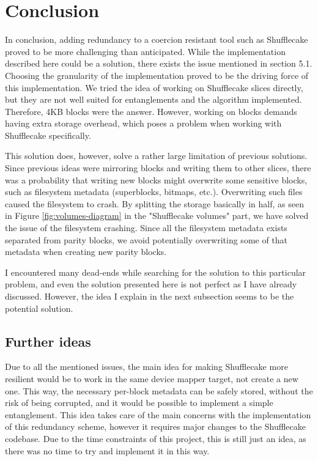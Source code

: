 \documentclass[a4paper,11pt,oneside]{report}
\begin{document}
\chapter{Conclusion}
In conclusion, adding redundancy to a coercion resistant tool such as Shufflecake proved to be more challenging than anticipated. While the implementation described here could be a solution, there exists the issue mentioned in section 5.1. Choosing the granularity of the implementation proved to be the driving force of this implementation. We tried the idea of working on Shufflecake slices directly, but they are not well suited for entanglements and the algorithm implemented. Therefore, 4KB blocks were the answer. However, working on blocks demands having extra storage overhead, which poses a problem when working with Shufflecake specifically. 

This solution does, however, solve a rather large limitation of previous solutions. Since previous ideas were mirroring blocks and writing them to other slices, there was a probability that writing new blocks might overwrite some sensitive blocks, such as filesystem metadata (superblocks, bitmaps, etc.). Overwriting such files caused the filesystem to crash. By splitting the storage basically in half, as seen in Figure \ref{fig:volumes-diagram} in the "Shufflecake volumes" part, we have solved the issue of the filesystem crashing. Since all the filesystem metadata exists separated from parity blocks, we avoid potentially overwriting some of that metadata when creating new parity blocks. 

I encountered many dead-ends while searching for the solution to this particular problem, and even the solution presented here is not perfect as I have already discussed. However, the idea I explain in the next subsection seems to be the potential solution. 

\section{Further ideas}
Due to all the mentioned issues, the main idea for making Shufflecake more resilient would be to work in the same device mapper target, not create a new one. This way, the necessary per-block metadata can be safely stored, without the risk of being corrupted, and it would be possible to implement a simple entanglement. This idea takes care of the main concerns with the implementation of this redundancy scheme, however it requires major changes to the Shufflecake codebase. Due to the time constraints of this project, this is still just an idea, as there was no time to try and implement it in this way. 
\end{document}
